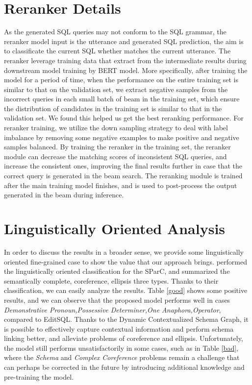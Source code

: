 \documentclass[letterpaper]{article} \usepackage{aaai21}  \usepackage{times}  \usepackage{helvet} \usepackage{courier}  \usepackage[hyphens]{url}  \usepackage{graphicx} \urlstyle{rm} \def\UrlFont{\rm}  \usepackage{natbib}  \usepackage{caption} \frenchspacing  \setlength{\pdfpagewidth}{8.5in}  \setlength{\pdfpageheight}{11in}
\begin{document}
\section{Reranker Details}
As the generated SQL queries may not conform to the SQL grammar, the reranker model input is the utterance and generated SQL prediction, the aim is to classificate the current SQL whether matches the current utterance. 
The reranker leverage training data that extract from the intermediate results during downstream model training by BERT model.
More specifically, after training the model for a period of time, when the performance on the entire training set is similar to that on the validation set, we extract negative samples from the incorrect queries in each small batch of beam in the training set, which ensure the distribution of candidates in the training set is similar to that in the validation set. We found this helped us get the best reranking performance. 
For reranker training, we utilize the down sampling strategy to deal with label imbalance by removing some negative examples to make positive and negative samples balanced.
By training the reranker in the training set, the reranker module can decrease the matching scores of inconsistent SQL queries, and increase the consistent ones, improving the final results further in case that the correct query is generated in the beam search.
The reranking module is trained after the main training model finishes, and is used to post-process the output generated in the beam during inference.


\section{Linguistically Oriented Analysis}
In order to discuss the results in a broader sense, we provide some linguistically oriented fine-grained case to show the value that our approach brings.
\citet{DBLP:conf/ijcai/LiuCGLZZ20} performed the linguistically oriented classification for the SParC, and summarized the semantically complete, coreference, ellipsis three types.
Thanks to their classification, we can easily analyze the results.
Table \ref{good} shows some positive results, and we can observe that the proposed model performs well in cases \textit{Demonstrative Pronoun,Possessive Determiner,One Anaphora,Operator}, compared to EditSQL.
Thanks to the Dynamic Contextualized Schema Graph, it is possible to effectively capture contextual information and perform schema linking better, and alleviate problems of coreference and ellipsis.
Unfortunately, the model still performs unsatisfactorily in some cases, such as in Table \ref{bad}, where the \textit{Schema} and \textit{Complex Coreference} problems remain a challenge that can perhaps be corrected in the future by introducing additional knowledge and pre-training the model.
\end{document}
